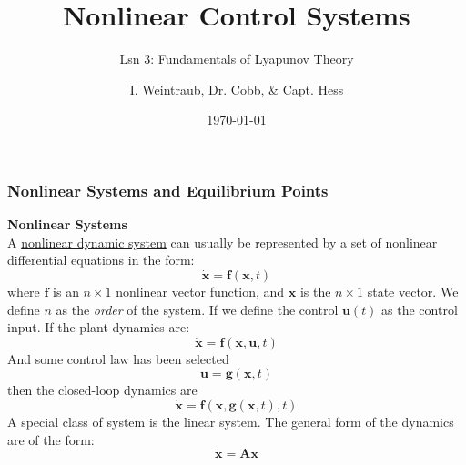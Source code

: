 \documentclass[11pt,handout]{beamer}   %
\title[Your Short Title]{Nonlinear Control Systems}
\subtitle{Lsn 3: Fundamentals of Lyapunov Theory}
\author{I. Weintraub, Dr. Cobb, \& Capt. Hess}
\institute{Air Force Institute of Technology}
\date{\today}
\begin{document}
\begin{frame}
  \titlepage
\end{frame}

\begin{frame}
\frametitle{Nonlinear Systems and Equilibrium Points}
\small
\textbf{Nonlinear Systems}\\
A \underline{nonlinear dynamic system} can usually be represented by a set of nonlinear differential equations in the form:
\begin{equation*}
\dot{\mathbf{x}} = \mathbf{f}(\mathbf{x},t)
\end{equation*}
where $\mathbf{f}$ is an $n \times 1$ nonlinear vector function, and $\mathbf{x}$ is the $n \times 1$ state vector. We define $n$ as the \textit{order} of the system. If we define the control $\mathbf{u}(t)$ as the control input. If the plant dynamics are:
\begin{equation*}
\dot{\mathbf{x}} = \mathbf{f}(\mathbf{x},\mathbf{u},t)
\end{equation*}
And some control law has been selected
\begin{equation*}
\mathbf{u} = \mathbf{g}(\mathbf{x},t)
\end{equation*}
then the closed-loop dynamics are
\begin{equation*}
\dot{\mathbf{x}} = \mathbf{f}(\mathbf{x},\mathbf{g}(\mathbf{x},t),t)
\end{equation*}
A special class of system is the linear system. The general form of the dynamics are of the form:
\begin{equation*}
\dot{\mathbf{x}} = \mathbf{A}\mathbf{x}
\end{equation*}
\end{frame}
\end{document}
